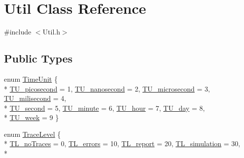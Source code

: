 \hypertarget{class_util}{\section{Util Class Reference}
\label{class_util}
}


{\ttfamily \#include $<$Util.\-h$>$}

\subsection*{Public Types}
\begin{DoxyCompactItemize}
\item 
enum \hyperlink{class_util_aadbd82055afeaa7d4fb4da513de628ff}{Time\-Unit} \{ \\*
\hyperlink{class_util_aadbd82055afeaa7d4fb4da513de628ffa61a2b7f78d5154e21558eeb7f7dcf189}{T\-U\-\_\-picosecond} = 1, 
\hyperlink{class_util_aadbd82055afeaa7d4fb4da513de628ffa180a2c9d13a0f09f4736faadcf647652}{T\-U\-\_\-nanosecond} = 2, 
\hyperlink{class_util_aadbd82055afeaa7d4fb4da513de628ffaea45c265b26be1b824e13c8c0197c596}{T\-U\-\_\-microsecond} = 3, 
\hyperlink{class_util_aadbd82055afeaa7d4fb4da513de628ffab2d1939f8eede127ea155ff7377a6408}{T\-U\-\_\-milisecond} = 4, 
\\*
\hyperlink{class_util_aadbd82055afeaa7d4fb4da513de628ffa2b8682aecb882a22a72fa80cee868574}{T\-U\-\_\-second} = 5, 
\hyperlink{class_util_aadbd82055afeaa7d4fb4da513de628ffa8a8dec2e0147e6d1d6de316c6607022c}{T\-U\-\_\-minute} = 6, 
\hyperlink{class_util_aadbd82055afeaa7d4fb4da513de628ffaed08a13fb576de0d635c1ada62e6ed64}{T\-U\-\_\-hour} = 7, 
\hyperlink{class_util_aadbd82055afeaa7d4fb4da513de628ffa7c189f7f3cfd7d611da081990ebd3971}{T\-U\-\_\-day} = 8, 
\\*
\hyperlink{class_util_aadbd82055afeaa7d4fb4da513de628ffa556642171373fb32274a3ff32e9818a9}{T\-U\-\_\-week} = 9
 \}
\item 
enum \hyperlink{class_util_a604561d00f5999b5ca280401140e58d9}{Trace\-Level} \{ \\*
\hyperlink{class_util_a604561d00f5999b5ca280401140e58d9ae16cd2d59f52612b89b7a094bf6ed758}{T\-L\-\_\-no\-Traces} = 0, 
\hyperlink{class_util_a604561d00f5999b5ca280401140e58d9a301dc2838784fa24261650a639c11cf1}{T\-L\-\_\-errors} = 10, 
\hyperlink{class_util_a604561d00f5999b5ca280401140e58d9a5db79a751ceac892c087e3acb5069e22}{T\-L\-\_\-report} = 20, 
\hyperlink{class_util_a604561d00f5999b5ca280401140e58d9a4b58bddec93bc38da370802e995c3e60}{T\-L\-\_\-simulation} = 30, 
\\*

\end{DoxyCompactItemize}
